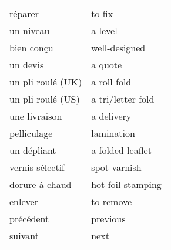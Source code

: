 \documentclass[
  10pt,
]{article}
\begin{document}
\begin{longtable}{ll}
réparer & to fix\\

\rowcolor{gray!6}  un niveau & a level\\

bien conçu & well-designed\\

\rowcolor{gray!6}  un devis & a quote\\

un pli roulé (UK) & a roll fold\\

\rowcolor{gray!6}  un pli roulé (US) & a tri/letter fold\\

une livraison & a delivery\\

\rowcolor{gray!6}  pelliculage & lamination\\

un dépliant & a folded leaflet\\

\rowcolor{gray!6}  vernis sélectif & spot varnish\\

dorure à chaud & hot foil stamping\\

\rowcolor{gray!6}  enlever & to remove\\

précédent & previous\\

\rowcolor{gray!6}  suivant & next\\
\bottomrule
\end{longtable}
\end{document}
